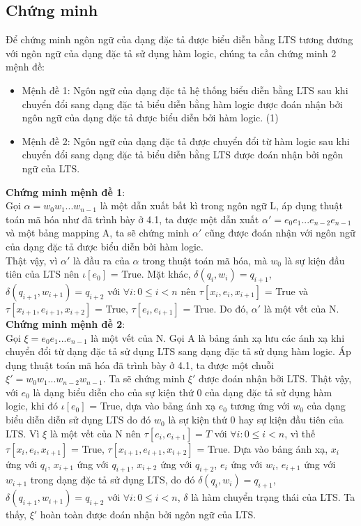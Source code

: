 \documentclass{article}
\begin{document}
\begin{flushleft}
		\section{Chứng minh}
		Để chứng minh ngôn ngữ của dạng đặc tả được biểu diễn bằng LTS tương đương với ngôn ngữ của dạng đặc tả sử dụng hàm logic, chúng ta cần chứng minh 2 mệnh đề:
		\begin{itemize}
			\item Mệnh đề 1: Ngôn ngữ của dạng đặc tả hệ thống biểu diễn bằng LTS sau khi chuyển đổi sang dạng đặc tả biểu diễn bằng hàm logic được đoán nhận bởi ngôn ngữ của dạng đặc tả được biểu diễn bởi hàm logic. (1)\\
			\item Mệnh đề 2: Ngôn ngữ của dạng đặc tả được chuyển đổi từ hàm logic sau khi chuyển đổi sang dạng đặc tả biểu diễn bằng LTS được đoán nhận bởi ngôn ngữ của LTS.
		\end{itemize}
		\textbf{Chứng minh mệnh đề 1}:\\
		Gọi $\alpha = w_0w_1...w_{n-1}$ là một dẫn xuất bất kì trong ngôn ngữ L, áp dụng thuật toán mã hóa như đã trình bày ở 4.1, ta được một dẫn xuất $\alpha' = e_0e_1...e_{n-2}e_{n-1}$ và một bảng mapping A, ta sẽ chứng minh $\alpha'$ cũng được đoán nhận với ngôn ngữ của dạng đặc tả được biểu diễn bởi hàm logic.\\
		Thật vậy, vì $\alpha'$ là đầu ra của $\alpha$ trong thuật toán mã hóa, mà $w_{0}$ là sự kiện đầu tiên của LTS nên $\iota[e_0]$ = True. Mặt khác, $\delta(q_i, w_i) = q_{i+1}$, $\delta(q_{i+1}, w_{i+1}) = q_{i+2}$ với $\forall i: 0 \leq i < n$ nên $\tau[x_i, e_i, x_{i+1}]$ = True và $\tau[x_{i+1}, e_{i+1}, x_{i+2}]$ = True, $\tau[e_i, e_{i+1}]$ = True. Do đó, $\alpha'$ là một vết của N.\\
		\textbf{Chứng minh mệnh đề 2}:\\
		Gọi $\xi = e_0e_1...e_{n-1}$ là một vết của N. Gọi A là bảng ánh xạ lưu các ánh xạ khi chuyển đổi từ dạng đặc tả sử dụng LTS sang dạng đặc tả sử dụng hàm logic. Áp dụng thuật toán mã hóa đã trình bày ở 4.1, ta được một chuỗi $\xi' = w_0w_1...w_{n-2}w_{n-1}$. Ta sẽ chứng minh $\xi'$ được đoán nhận bởi LTS. Thật vậy, với $e_0$ là dạng biểu diễn cho của sự kiện thứ 0 của dạng đặc tả sử dụng hàm logic, khi đó $\iota[e_0]$ = True, dựa vào bảng ánh xạ $e_0$ tương ứng với  $w_{0}$ của dạng biểu diễn diễn sử dụng LTS do đó $w_{0}$ là sự kiện thứ 0 hay sự kiện đầu tiên của LTS. Vì $\xi$ là một vết của N nên $\tau[e_i,e_{i+1}] = T$ với $\forall i: 0 \leq i < n$, vì thế $\tau[x_i, e_i, x_{i+1}]$ = True, $\tau[x_{i+1}, e_{i+1}, x_{i+2}]$ = True. Dựa vào bảng ánh xạ, $x_i$ ứng với $q_i$, $x_{i+1}$ ứng với $q_{i+1}$, $x_{i+2}$ ứng với $q_{i+2}$, $e_i$ ứng với $w_i$, $e_{i+1}$ ứng với $w_{i+1}$ trong dạng đặc tả sử dụng LTS, do đó $\delta(q_{i}, w_{i}) = q_{i+1}$, $\delta(q_{i+1}, w_{i+1}) = q_{i+2}$ với $\forall i: 0 \leq i < n$, $\delta$ là hàm chuyển trạng thái của LTS. Ta thấy, $\xi'$ hoàn toàn được đoán nhận bởi ngôn ngữ của LTS.
	\end{flushleft}
\end{document}
